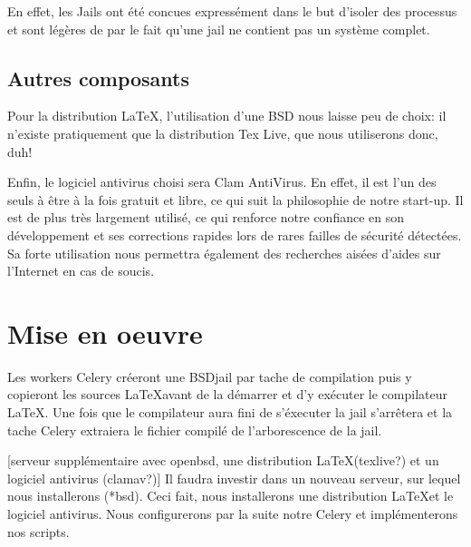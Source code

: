 \documentclass[10pt,a4paper]{article}
\begin{document}
En effet, les Jails ont été concues expressément dans le but d'isoler des processus et sont légères de par le fait qu'une jail ne contient pas un système complet.

\subsection{Autres composants}

Pour la distribution \LaTeX, l'utilisation d'une BSD nous laisse peu de choix: il n'existe pratiquement que la distribution Tex Live, que nous utiliserons donc, duh! %

Enfin, le logiciel antivirus choisi sera Clam AntiVirus.
En effet, il est l'un des seuls à être à la fois gratuit et libre, ce qui suit la philosophie de notre start-up.
Il est de plus très largement utilisé, ce qui renforce notre confiance en son développement et ses corrections rapides lors de rares failles de sécurité détectées.
Sa forte utilisation nous permettra également des recherches aisées d'aides sur l'Internet en cas de soucis.

\section{Mise en oeuvre}

Les workers Celery créeront une BSDjail par tache de compilation puis y copieront les sources \LaTeX avant de la démarrer et d'y exécuter le compilateur \LaTeX.
Une fois que le compilateur aura fini de s'éxecuter la jail s'arrêtera et la tache Celery extraiera le fichier compilé de l'arborescence de la jail.

[serveur supplémentaire avec openbsd, une distribution \LaTeX (texlive?) et un logiciel antivirus (clamav?)]
Il faudra investir dans un nouveau serveur, sur lequel nous installerons (*bsd).
Ceci fait, nous installerons une distribution \LaTeX et le logiciel antivirus.
Nous configurerons par la suite notre Celery et implémenterons nos scripts.
\end{document}
